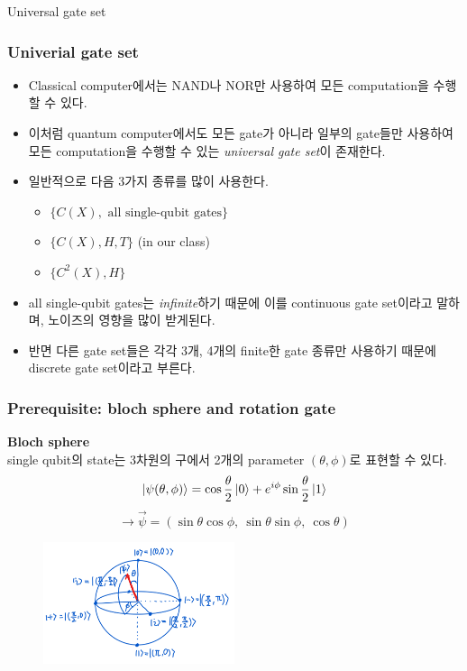 \documentclass[9pt]{beamer}
\begin{document}
    \begin{section}{Universal gate set}
        \begin{frame}
            \frametitle{Univerial gate set}
            \begin{itemize}
                \item Classical computer에서는 NAND나 NOR만 사용하여 모든 computation을 수행할 수 있다.
                \item 이처럼 quantum computer에서도 모든 gate가 아니라 일부의 gate들만 사용하여 모든 computation을 수행할 수 있는 \textit{universal gate set}이 존재한다.
                \item 일반적으로 다음 3가지 종류를 많이 사용한다.
                \begin{itemize}
                    \item $\{C(X), \text{ all single-qubit gates}\}$
                    \item $\{C(X), H, T\}$ (in our class)
                    \item $\{C^2(X), H\}$
                \end{itemize}
                \item all single-qubit gates는 \textit{infinite}하기 때문에 이를 continuous gate set이라고 말하며, 노이즈의 영향을 많이 받게된다.
                \item 반면 다른 gate set들은 각각 3개, 4개의 finite한 gate 종류만 사용하기 때문에 discrete gate set이라고 부른다. 
            \end{itemize}
        \end{frame}

        \begin{frame}
            \frametitle{Prerequisite: bloch sphere and rotation gate}
            \textbf{Bloch sphere}
            \\single qubit의 state는 3차원의 구에서 2개의 parameter $(\theta, \phi)$로 표현할 수 있다.
            $$ \ket{\psi(\theta, \phi)} = \cos \frac{\theta}{2} \ket 0 + e^{i \phi} \sin  \frac{\theta}{2}  \ket 1 $$ 
            $$ \longrightarrow \vec{\psi} = (\sin \theta \cos \phi,\ \sin \theta \sin \phi, \ \cos \theta)$$
            \begin{figure}
                \includegraphics[width=0.5\textwidth]{image/L2_bloch_sphere.png}
            \end{figure}
        \end{frame}


\end{section}
\end{document}

